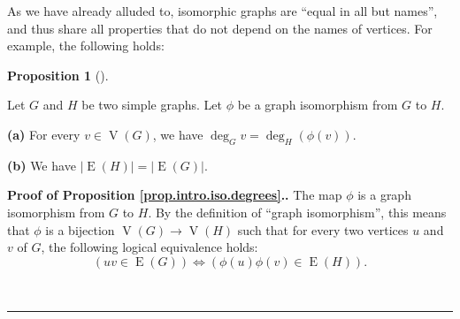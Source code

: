 \documentclass[numbers=enddot,12pt,final,onecolumn,notitlepage]{scrartcl}%
\theoremstyle{definition}
\newtheorem{prop}[theo]{Proposition}
\newenvironment{proposition}[1][]
{\begin{prop}[#1]\begin{leftbar}}
{\end{leftbar}\end{prop}}
\newenvironment{proof}[1][Proof]{\noindent\textbf{#1.} }{\ \rule{0.5em}{0.5em}}
\newcommand{\abs}[1]{\left| #1 \right|}
\newcommand{\tup}[1]{\left( #1 \right)}
\newcommand{\verts}[1]{\operatorname{V}\left( #1 \right)}
\newcommand{\edges}[1]{\operatorname{E}\left( #1 \right)}
\begin{document}
As we have already alluded to, isomorphic graphs are ``equal in all
but names'', and thus share all properties that do not depend on the
names of vertices. For example, the following holds:

\begin{proposition} \label{prop.intro.iso.degrees}
Let $G$ and $H$ be two simple graphs. Let $\phi$ be a graph
isomorphism from $G$ to $H$.

\textbf{(a)} For every $v \in \verts{G}$, we have
$\deg_G v = \deg_H \tup{\phi\tup{v}}$.

\textbf{(b)} We have
$\abs{\edges{H}} = \abs{\edges{G}}$.
\end{proposition}

\begin{proof}[Proof of Proposition \ref{prop.intro.iso.degrees}.]
The map $\phi$ is a graph isomorphism from $G$ to $H$. By the
definition of ``graph isomorphism'', this means that $\phi$ is a
bijection $\verts{G} \to \verts{H}$ such that for every two
vertices $u$ and $v$ of $G$, the following logical equivalence holds:
\begin{equation}
\left( uv \in \edges{G} \right)
\Longleftrightarrow
\left( \phi\tup{u}\phi\tup{v} \in \edges{H} \right) .
\label{pf.prop.intro.iso.degrees.1}
\end{equation}


\end{proof}
\end{document}
